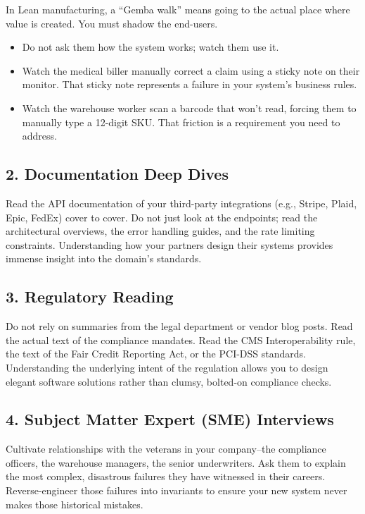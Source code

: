 \documentclass[
  11pt,
  openany,
  oneside]{book}
\providecommand{\tightlist}{%
  \setlength{\itemsep}{0pt}\setlength{\parskip}{0pt}}
\begin{document}
In Lean manufacturing, a ``Gemba walk'' means going to the actual place
where value is created. You must shadow the end-users.

\begin{itemize}
\tightlist
\item
  Do not ask them how the system works; watch them use it.
\item
  Watch the medical biller manually correct a claim using a sticky note
  on their monitor. That sticky note represents a failure in your
  system's business rules.
\item
  Watch the warehouse worker scan a barcode that won't read, forcing
  them to manually type a 12-digit SKU. That friction is a requirement
  you need to address.
\end{itemize}

\subsection{2. Documentation Deep Dives}\label{documentation-deep-dives}

Read the API documentation of your third-party integrations (e.g.,
Stripe, Plaid, Epic, FedEx) cover to cover. Do not just look at the
endpoints; read the architectural overviews, the error handling guides,
and the rate limiting constraints. Understanding how your partners
design their systems provides immense insight into the domain's
standards.

\subsection{3. Regulatory Reading}\label{regulatory-reading}

Do not rely on summaries from the legal department or vendor blog posts.
Read the actual text of the compliance mandates. Read the CMS
Interoperability rule, the text of the Fair Credit Reporting Act, or the
PCI-DSS standards. Understanding the underlying intent of the regulation
allows you to design elegant software solutions rather than clumsy,
bolted-on compliance checks.

\subsection{4. Subject Matter Expert (SME)
Interviews}\label{subject-matter-expert-sme-interviews}

Cultivate relationships with the veterans in your company--the
compliance officers, the warehouse managers, the senior underwriters.
Ask them to explain the most complex, disastrous failures they have
witnessed in their careers. Reverse-engineer those failures into
invariants to ensure your new system never makes those historical
mistakes.
\end{document}
